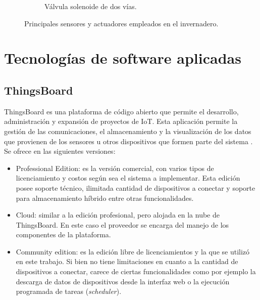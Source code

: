 \begin{figure}[!htpb]
\begin{subfigure}[b]{0.3\textwidth}
         \caption{Válvula solenoide de dos vías.}
         \label{fig:valve}
     \end{subfigure}
        \caption[Principales sensores y actuadores empleados en el invernadero.]{Principales sensores y actuadores empleados en el invernadero.}
        \label{fig:sensores}
\end{figure}




\section{Tecnologías de software aplicadas}
\label{sec:Software aplicado}
\subsection{ThingsBoard}
\label{sec:ThingsBoard}
ThingsBoard es una plataforma de código abierto que permite el desarrollo, administración y expansión de proyectos de IoT. Esta aplicación permite la gestión de las comunicaciones, el almacenamiento y la visualización de los datos que provienen de los sensores u otros dispositivos que formen parte del sistema \citep{thingsboard:1}.
Se ofrece en las siguientes versiones:
\begin{itemize}

\item Professional Edition: es la versión comercial, con varios tipos de licenciamiento y costos según sea el sistema a implementar. Esta edición posee soporte técnico, ilimitada cantidad de dispositivos a conectar y soporte para almacenamiento híbrido entre otras funcionalidades.

\item Cloud: similar a la edición profesional, pero alojada en la nube de ThingsBoard. En este caso el proveedor se encarga del manejo de los componentes de la plataforma.
 
\item Community edition: es la edición libre de licenciamientos y la que se utilizó en este trabajo. Si bien no tiene limitaciones en cuanto a la cantidad de dispositivos a conectar, carece de ciertas funcionalidades como por ejemplo la descarga de datos de dispositivos desde la interfaz web o la ejecución programada de tareas (\textit{scheduler}).
\end{itemize}
%
%
